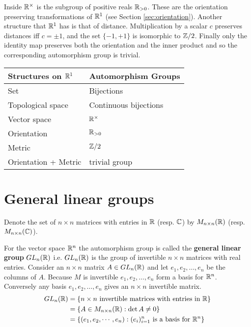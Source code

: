 Inside $\mathbb{R}^{\times}$ is the subgroup of positive reals $\mathbb{R} _ {> 0}$. These are the orientation preserving transformations of $\mathbb{R}^1$ (see Section \ref{sec:orientation}). Another structure that $\mathbb{R}^1$ has is that of distance. Multiplication by a scalar $c$ preserves distances iff $c = \pm 1$, and the set $\{ -1, +1 \}$ is isomorphic to $\mathbb{Z}/2$. Finally only the identity map preserves both the orientation and the inner product and so the corresponding automorphism group is trivial.

\begin{center}
	\begin{tabular}{ll}
		Structures on $\mathbb{R}^1$ & Automorphism Groups   \\\hline
		Set                  & Bijections            \\
		Topological space    & Continuous bijections \\
		Vector space         & $\mathbb{R}^{\times}$         \\
		Orientation          & $\mathbb{R}_{>0}$             \\
		Metric               & $\mathbb{Z}/2$                \\
		Orientation + Metric & trivial group
	\end{tabular}
\end{center}




\section{General linear groups}

Denote the set of $n \times n$ matrices with entries in $\mathbb{R}$ (resp. $\mathbb{C}$) by $M_{n \times n}(\mathbb{R})$ (resp. $M_{n \times n}(\mathbb{C})$).

For the vector space $\mathbb{R}^n$ the automorphism group is called the \textbf{general linear group} $GL_n(\mathbb{R})$ i.e. $GL_n(\mathbb{R})$ is the group of invertible $n \times n$ matrices with real entries. Consider an $n \times n$ matrix $A \in GL_n(\mathbb{R})$ and let $e_1, e_2, \ldots , e_n$ be the columns of $A$. Because $M$ is invertible $e_1, e_2, \ldots , e_n$ form a basis for $\mathbb{R}^n$. Conversely any basis $e_1, e_2, \ldots , e_n$ gives an $n \times n$ invertible matrix.
\begin{align}
	GL_n(\mathbb{R})
	  & = \{ n \times n \mbox{ invertible matrices with entries in } \mathbb{R} \}             \\
	  & = \{ A \in M_{n \times n}(\mathbb{R}) : \det A \neq 0\}                                \\
	  & = \{ (e_1 , e_2 , \cdots , e_n) : (e_i)_{i=1}^n \mbox{ is a basis for } \mathbb{R}^n\}
\end{align}








